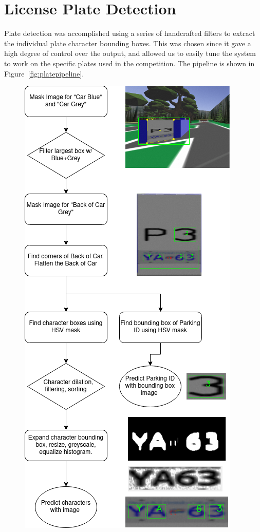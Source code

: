 \documentclass[titlepage, twocolumn]{article}
\begin{document}
\section{License Plate Detection}

Plate detection was accomplished using a series of handcrafted filters to extract the individual plate character bounding boxes. This was chosen since it gave a high degree of control over the output, and allowed us to easily tune the system to work on the specific plates used in the competition. The pipeline is shown in Figure~\ref{fig:platepipeline}.

\begin{figure}[H]
\centering
\includegraphics[width=\linewidth]{Image Processing Algorithm.drawio.png}

\end{figure}
\end{document}
